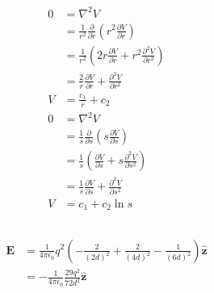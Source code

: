 \documentclass{article}
\renewcommand{\vec}[1]{\boldsymbol{\mathbf{#1}}}
\newcommand{\uvec}[1]{\hat{\vec{#1}}}
\newcommand{\ke}{\frac{1}{4 \pi \epsilon_0}}
\begin{document}
\begin{align*}
  0 & = \nabla^2 V                                                                                             \\
    & = \frac{1}{r^2} \frac{\partial}{\partial r} \left( r^2 \frac{\partial V}{\partial r} \right)             \\
    & = \frac{1}{r^2} \left( 2 r \frac{\partial V}{\partial r} + r^2 \frac{\partial^2 V}{\partial r^2} \right) \\
    & = \frac{2}{r} \frac{\partial V}{\partial r} + \frac{\partial^2 V}{\partial r^2}                          \\
  V & = \frac{c_1}{r} + c_2                                                                                    \\
  0 & = \nabla^2 V                                                                                             \\
    & = \frac{1}{s} \frac{\partial}{\partial s} \left( s \frac{\partial V}{\partial s} \right)                 \\
    & = \frac{1}{s} \left( \frac{\partial V}{\partial s} + s \frac{\partial^2 V}{\partial s^2} \right)         \\
    & = \frac{1}{s} \frac{\partial V}{\partial s} + \frac{\partial^2 V}{\partial s^2}                          \\
  V & = c_1 + c_2 \ln s
\end{align*}

\setcounter{subsection}{6}
\subsection{}

\begin{align*}
  \vec{E} & = \ke q^2 \left( -\frac{2}{(2 d)^2} + \frac{2}{(4 d)^2} - \frac{1}{(6 d)^2} \right) \uvec{z} \\
          & = -\ke \frac{29 q^2}{72 d^2} \uvec{z}
\end{align*}

\subsection{}
\end{document}
